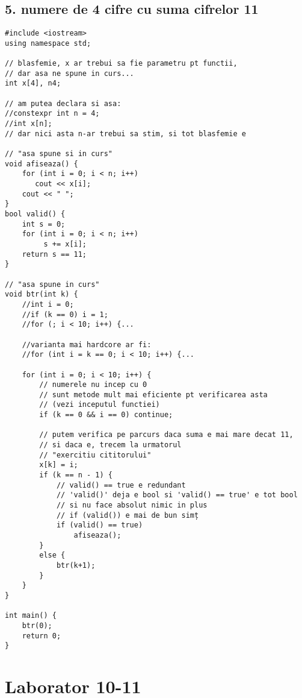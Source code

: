 \documentclass[11pt]{article}
\begin{document}
\subsection*{5. numere de 4 cifre cu suma cifrelor 11}
\label{sec:org030a385}
\begin{verbatim}
#include <iostream>
using namespace std;

// blasfemie, x ar trebui sa fie parametru pt functii,
// dar asa ne spune in curs...
int x[4], n4;

// am putea declara si asa:
//constexpr int n = 4;
//int x[n];
// dar nici asta n-ar trebui sa stim, si tot blasfemie e

// "asa spune si in curs"
void afiseaza() {
    for (int i = 0; i < n; i++)
       cout << x[i];
    cout << " ";
}
bool valid() {
    int s = 0;
    for (int i = 0; i < n; i++)
         s += x[i];
    return s == 11;
}

// "asa spune in curs"
void btr(int k) {
    //int i = 0;
    //if (k == 0) i = 1;
    //for (; i < 10; i++) {...

    //varianta mai hardcore ar fi:
    //for (int i = k == 0; i < 10; i++) {...

    for (int i = 0; i < 10; i++) {
        // numerele nu incep cu 0
        // sunt metode mult mai eficiente pt verificarea asta
        // (vezi inceputul functiei)
        if (k == 0 && i == 0) continue;

        // putem verifica pe parcurs daca suma e mai mare decat 11,
        // si daca e, trecem la urmatorul
        // "exercitiu cititorului"
        x[k] = i;
        if (k == n - 1) {
            // valid() == true e redundant
            // 'valid()' deja e bool si 'valid() == true' e tot bool
            // si nu face absolut nimic in plus
            // if (valid()) e mai de bun simț
            if (valid() == true)
                afiseaza();
        }
        else {
            btr(k+1);
        }
    }  
}

int main() {
    btr(0);
    return 0;
}
\end{verbatim}

\pagebreak
\section*{Laborator 10-11}
\label{sec:org08434bb}
\end{document}
